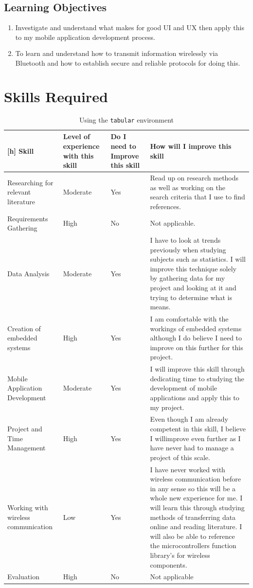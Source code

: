\subsection{Learning Objectives}\label{tor:learningobjectives}
\begin{enumerate}
\item Investigate and understand what makes for good UI and UX then apply this to my mobile application development process. 
\item To learn and understand how to transmit information wirelessly via Bluetooth and how to establish secure and reliable protocols for doing this.
\end{enumerate}

\section{Skills Required}\label{tor:skillsrequired}
\begin{longtable}{| p{}|p{}| p{} | p{}|}[h]
\hline
\textbf{Skill} & \textbf{Level of experience with this skill} & \textbf{Do I need to Improve this skill} & \textbf{How will I improve this skill} \\
\hline \hline
Researching for relevant literature &
Moderate &
Yes & Read up on research methods as well as working on the search criteria that I use to find references.\\
\hline
Requirements Gathering &
High &
No & Not applicable. \\
\hline
Data Analysis &
Moderate &
Yes & I have to look at trends previously when studying subjects such as statistics. I will improve this technique solely by gathering data for my project and looking at it and trying to determine what is means. \\
\hline
Creation of embedded systems &
High &
Yes & I am comfortable with the workings of embedded systems although I do believe I need to improve on this further for this project. \\
\hline
Mobile Application Development &
Moderate &
Yes & I will improve this skill through dedicating time to studying the development of mobile applications and apply this to my project. \\
\hline
Project and Time Management &
High &
Yes & Even though I am already competent in this skill, I believe I willimprove even further as I have never had to manage a project of this scale.\\
\hline
Working with wireless communication &
Low &
Yes & I have never worked with wireless communication before in any sense so this will be a whole new experience for me. I will learn this through studying methods of transferring data online and reading literature. I will also be able to reference the microcontrollers function library’s for wireless components.\\
\hline
Evaluation &
High &
No & Not applicable
\caption{Using the \texttt{tabular} environment\label{device:table}}
\end{longtable}

